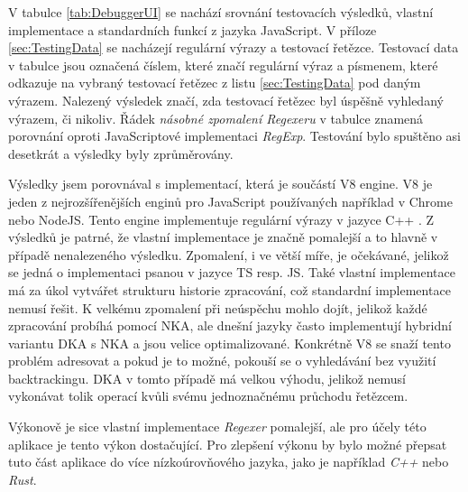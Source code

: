V tabulce \ref{tab:DebuggerUI} se nachází srovnání testovacích výsledků, vlastní implementace a standardních funkcí z jazyka JavaScript.
V příloze \ref{sec:TestingData} se nacházejí regulární výrazy a testovací řetězce. 
Testovací data v tabulce jsou označená číslem, které značí regulární výraz a písmenem, které odkazuje na vybraný testovací řetězec z listu \ref{sec:TestingData} pod daným výrazem.
Nalezený výsledek značí, zda testovací řetězec byl úspěšně vyhledaný výrazem, či nikoliv. 
Řádek \textit{násobné zpomalení Regexeru} v tabulce znamená porovnání oproti JavaScriptové implementaci \textit{RegExp}.
Testování bylo spuštěno asi desetkrát a výsledky byly zprůměrovány.

Výsledky jsem porovnával s implementací, která je součástí V8 engine.
V8 je jeden z nejrozšířenějších enginů pro JavaScript používaných například v Chrome nebo NodeJS.
Tento engine implementuje regulární výrazy v jazyce C++ \cite{Bidlingmaie_2021, Gruber_2017}.
Z výsledků je patrné, že vlastní implementace je značně pomalejší a to hlavně v případě nenalezeného výsledku.
Zpomalení, i ve větší míře, je očekávané, jelikož se jedná o implementaci psanou v jazyce TS resp. JS.
Také vlastní implementace má za úkol vytvářet strukturu historie zpracování, což standardní implementace nemusí řešit.
K velkému zpomalení při neúspěchu mohlo dojít, jelikož každé zpracování probíhá pomocí NKA, ale dnešní jazyky často implementují hybridní variantu DKA s NKA a jsou velice optimalizované.
Konkrétně V8 se snaží tento problém adresovat a pokud je to možné, pokouší se o vyhledávání bez využití backtrackingu.
DKA v tomto případě má velkou výhodu, jelikož nemusí vykonávat tolik operací kvůli svému jednoznačnému průchodu řetězcem.

Výkonově je sice vlastní implementace \textit{Regexer} pomalejší, ale pro účely této aplikace je tento výkon dostačující.
Pro zlepšení výkonu by bylo možné přepsat tuto část aplikace do více nízkoúrovňového jazyka, jako je například \textit{C++} nebo \textit{Rust}.
